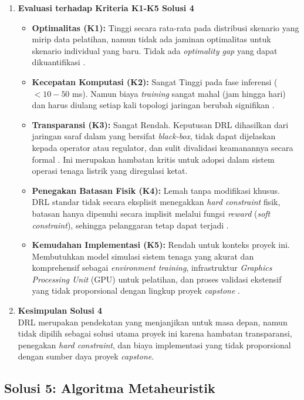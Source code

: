 \begin{enumerate}
\item[b.] \textbf{Evaluasi terhadap Kriteria K1-K5 Solusi 4}
\begin{itemize}
    \item[i.] \textbf{Optimalitas (K1):} Tinggi secara rata-rata pada distribusi skenario yang mirip data pelatihan, namun tidak ada jaminan optimalitas untuk skenario individual yang baru. Tidak ada \textit{optimality gap} yang dapat dikuantifikasi \cite{Chen2023, Lai2026}.
    \item[ii.] \textbf{Kecepatan Komputasi (K2):} Sangat Tinggi pada fase inferensi ($<10-50$ ms). Namun biaya \textit{training} sangat mahal (jam hingga hari) dan harus diulang setiap kali topologi jaringan berubah signifikan \cite{Chen2023}.
    \item[iii.] \textbf{Transparansi (K3):} Sangat Rendah. Keputusan DRL dihasilkan dari jaringan saraf dalam yang bersifat \textit{black-box}, tidak dapat dijelaskan kepada operator atau regulator, dan sulit divalidasi keamanannya secara formal \cite{Lai2026, ChenBai2020}. Ini merupakan hambatan kritis untuk adopsi dalam sistem operasi tenaga listrik yang diregulasi ketat.
    \item[iv.] \textbf{Penegakan Batasan Fisik (K4):} Lemah tanpa modifikasi khusus. DRL standar tidak secara eksplisit menegakkan \textit{hard constraint} fisik, batasan hanya dipenuhi secara implisit melalui fungsi \textit{reward} (\textit{soft constraint}), sehingga pelanggaran tetap dapat terjadi \cite{ChenBai2020}.
    \item[v.] \textbf{Kemudahan Implementasi (K5):} Rendah untuk konteks proyek ini. Membutuhkan model simulasi sistem tenaga yang akurat dan komprehensif sebagai \textit{environment training}, infrastruktur \textit{Graphics Processing Unit} (GPU) untuk pelatihan, dan proses validasi ekstensif yang tidak proporsional dengan lingkup proyek \textit{capstone} \cite{Chen2023}.
\end{itemize}
 
\item[c.] \textbf{Kesimpulan Solusi 4} \\
DRL merupakan pendekatan yang menjanjikan untuk masa depan, namun tidak dipilih sebagai solusi utama proyek ini karena hambatan transparansi, penegakan \textit{hard constraint}, dan biaya implementasi yang tidak proporsional dengan sumber daya proyek \textit{capstone}.
\end{enumerate}

\subsection{Solusi 5: Algoritma Metaheuristik}
\label{subsec:Solusi_5}

